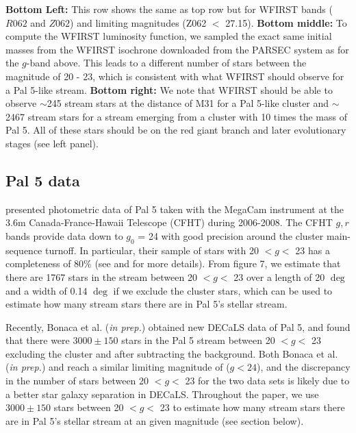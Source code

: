 \documentclass[twocolumn]{aastex62}
\newcommand{\todo}[1]{{\color{red} TODO: #1}}
\begin{document}
\begin{figure*}
{{\bf Bottom Left:} This row shows the same as top row but for WFIRST bands ($R062$ and $Z062$) and limiting magnitudes (Z062 $<$ 27.15). {\bf Bottom middle:} To compute the WFIRST luminosity function, we sampled the exact same initial masses from the WFIRST isochrone downloaded from the PARSEC system as for the $g$-band above. This leads to a different number of stars between the magnitude of 20 - 23, which is consistent with what WFIRST should observe for a Pal 5-like stream. {\bf Bottom right:} We note that WFIRST should be able to observe $\sim$245 stream stars at the distance of M31 for a Pal 5-like cluster and $\sim$2467 stream stars for a stream emerging from a cluster with 10 times the mass of Pal 5. All of these stars should be on the red giant branch and later evolutionary stages (see left panel).}
\label{fig:iso_cfht}
\end{figure*}



\subsection{Pal 5 data}
\label{sec:pal5}
 \citet{ibata16} presented photometric data of Pal 5 taken with the MegaCam instrument at the 3.6m Canada-France-Hawaii Telescope (CFHT) during 2006-2008. The CFHT $g, r$ bands provide data down to $g_0$ = 24 with good precision around the cluster main-sequence turnoff. In particular, their sample of stars with 20 $< g <$ 23 has a completeness of 80\% (see \citealt{ibata16} and \citealt{ibata17} for more details). From \citet{ibata16} figure 7, we estimate that there are 1767 stars in the stream between 20 $< g <$ 23 over a length of 20 $\deg$  and a width of 0.14 $\deg$ if we exclude the cluster stars, which can be used to estimate how many stream stars there are in Pal 5's stellar stream.
 
Recently, Bonaca et al. ({\it in prep.}) obtained new DECaLS data of Pal 5, and found that there were $3000 \pm 150$ stars in the Pal 5 stream between 20 $< g <$ 23 excluding the cluster and after subtracting the background. Both Bonaca et al. ({\it in prep.}) and  \citet{ibata16} reach a similar limiting magnitude of ($g < 24$), and the discrepancy in the number of stars  between 20 $< g <$ 23 for the two data sets is likely due to a better star galaxy separation in DECaLS. Throughout the paper, we use $3000 \pm 150$ stars between 20 $< g <$ 23 to estimate how many stream stars there are in Pal 5's stellar stream at an given magnitude (see section below).
\end{document}
